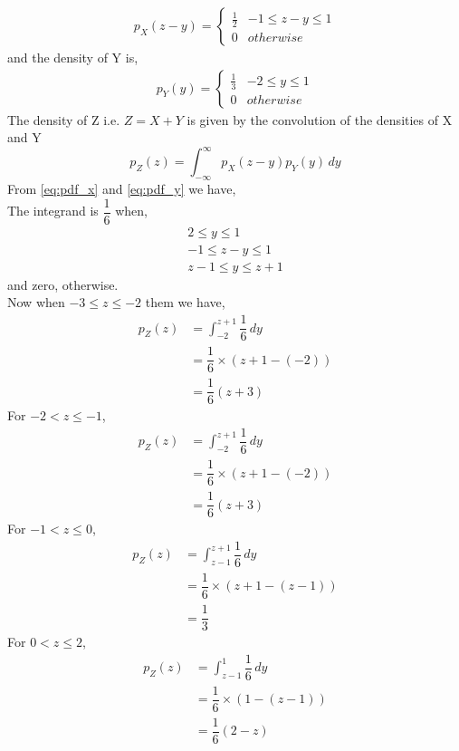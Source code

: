 \documentclass[journal,12pt,twocolumn]{IEEEtran}
\begin{document}
\begin{align}
\label{eq:pdf_x}
p_{X}(z-y)  = 
\begin{cases}
\frac{1}{2} & -1 \le z-y \le 1
\\
0 & otherwise
\end{cases}
\end{align}
and the density of Y is,
\begin{align}
\label{eq:pdf_y}
p_{Y}(y)  = 
\begin{cases}
\frac{1}{3} & -2 \le y \le 1
\\
0 & otherwise
\end{cases}
\end{align}
The density of Z i.e. $Z= X + Y $ is given by the convolution of the densities of X and Y
\begin{equation}
    p_Z(z) =  \int_{- \infty}^{\infty} p_X(z-y)p_Y(y) \,dy 
\end{equation}
From \ref{eq:pdf_x} and \ref{eq:pdf_y} we have, \\
The integrand is $\dfrac{1}{6}$ when,
\begin{align}
    2 \le y \le 1 \\
    -1 \le z-y \le 1 \\
    z-1 \le y \le z+1
\end{align}
and zero, otherwise. \\
Now when $-3 \le z \le -2$ them we have, 
\begin{align}
    p_Z(z) &=   \int_{-2}^{z+1} \dfrac{1}{6} \,dy  \\
          &= \dfrac{1}{6} \times ( z+1 - (-2)) \\
          &= \dfrac{1}{6}(z+3)
\end{align}
For $ -2 < z \le -1 $,
\begin{align}
    p_Z(z) &=   \int_{-2}^{z+1} \dfrac{1}{6} \,dy  \\
          &= \dfrac{1}{6} \times ( z+1 - (-2)) \\
          &= \dfrac{1}{6}(z+3)
\end{align}
For $ -1 < z \le 0 $,
\begin{align}
    p_Z(z) &=   \int_{z-1}^{z+1} \dfrac{1}{6} \,dy  \\
          &= \dfrac{1}{6} \times ( z+1 - (z-1)) \\
          &= \dfrac{1}{3}
\end{align}
For $ 0 < z \le 2$,
\begin{align}
    p_Z(z) &=   \int_{z-1}^{1} \dfrac{1}{6} \,dy  \\
          &= \dfrac{1}{6} \times ( 1- (z-1)) \\
          &= \dfrac{1}{6}(2-z)
\end{align}
\end{document}
